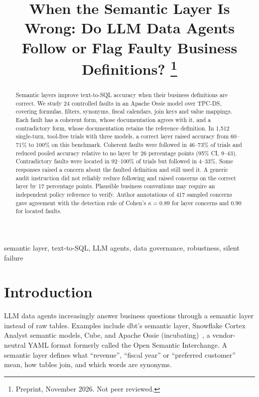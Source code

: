 \documentclass[conference]{IEEEtran}
\begin{document}
\title{When the Semantic Layer Is Wrong: Do LLM Data Agents Follow or Flag Faulty Business Definitions?%
\thanks{Preprint, November 2026. Not peer reviewed.}}

\author{
}

\maketitle
\pagestyle{plain}
\thispagestyle{plain}

\begin{abstract}
Semantic layers improve text-to-SQL accuracy when their business definitions are correct. We study 24 controlled faults in an Apache Ossie model over TPC-DS, covering formulas, filters, synonyms, fiscal calendars, join keys and value mappings. Each fault has a coherent form, whose documentation agrees with it, and a contradictory form, whose documentation retains the reference definition. In 1,512 single-turn, tool-free trials with three models, a correct layer raised accuracy from 60--71\% to 100\% on this benchmark. Coherent faults were followed in 46--73\% of trials and reduced pooled accuracy relative to no layer by 26 percentage points (95\% CI, 9--43). Contradictory faults were located in 92--100\% of trials but followed in 4--33\%. Some responses raised a concern about the faulted definition and still used it. A generic audit instruction did not reliably reduce following and raised concerns on the correct layer by 17 percentage points. Plausible business conventions may require an independent policy reference to verify. Author annotations of 417 sampled concerns gave agreement with the detection rule of Cohen's $\kappa = 0.89$ for layer concerns and $0.90$ for located faults.
\end{abstract}

\begin{IEEEkeywords}
semantic layer, text-to-SQL, LLM agents, data governance, robustness, silent failure
\end{IEEEkeywords}

\section{Introduction}

LLM data agents increasingly answer business questions through a semantic layer instead of raw tables. Examples include dbt's semantic layer, Snowflake Cortex Analyst semantic models, Cube, and Apache Ossie (incubating)~\cite{ossie}, a vendor-neutral YAML format formerly called the Open Semantic Interchange. A semantic layer defines what ``revenue'', ``fiscal year'' or ``preferred customer'' mean, how tables join, and which words are synonyms.
\end{document}
